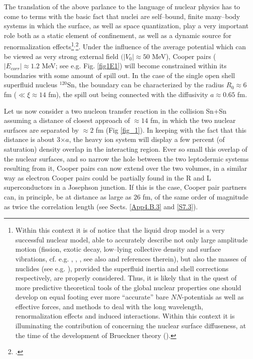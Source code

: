 The translation of the above parlance to the language of nuclear physics has to come to terms with the basic fact that nuclei are self--bound, finite many--body systems in which the surface, as well as space quantization, play a very important role both as a static element of confinement, as well as a dynamic source for renormalization effects\footnote{Within this context it is of notice that the liquid drop model is a very successful nuclear model, able to accurately describe not only large amplitude motion (fission, exotic decay, low--lying collective density and surface vibrations, cf. e.g. \cite{Bohr:39}, \cite{Barranco:90}, \cite{Bertsch:88b}, see also \cite{Brink:05} and references therein), but also the masses of nuclides (see e.g. \cite{Moller:95}), provided the superfluid inertia and shell corrections respectively, are properly considered. Thus, it is likely that in the quest of  more predictive theoretical tools of the global nuclear properties one should develop on equal footing ever more ``accurate'' bare $NN$-potentials as well as effective forces, and methods to deal with the long wavelength, renormalization effects and induced interactions. Within this context it is illuminating the contribution of \cite{Anderson:62} concerning the nuclear surface diffuseness, at the time of the development of  Brueckner theory (\cite{Brueckner:61}).}$^,$\footnote{\cite{Broglia:02d}.}.
Under the influence of the average potential which can be viewed as very strong external field $(|V_0|\approx 50$ MeV), Cooper pairs ($|E_{corr}|\approx 1.2$ MeV; see e.g. Fig. \ref{fig1E1}) will become constrained within its boundaries with some amount of spill out. In the case of the single open shell superfluid nucleus $^{120}$Sn, the boundary can be characterized by the radius $R_0\approx 6$ fm ($\ll \xi\approx 14$ fm), the spill out being connected with the diffusivity $a\approx 0.65$ fm. 


Let us now consider a two nucleon transfer reaction in the collision Sn+Sn assuming a distance of closest approach of $\approx 14$ fm, in which the two nuclear surfaces are separated by $\approx 2$ fm (Fig \ref{fig_1}). In keeping with the fact that this distance is about 3$\times a$, the heavy ion system will display a few percent (of saturation) density overlap in the interacting region. Ever so small this overlap of the nuclear surfaces, and so narrow the hole between the two leptodermic systems resulting from  it,  Cooper pairs can now extend over the two volumes, in a similar way as electron Cooper pairs could be partially found in the R and L superconductors in a Josephson junction. If this is the case, Cooper pair partners can, in principle, be at distance as large as 26 fm, of the same order of magnitude as twice the correlation length (see Sects. \ref{App4.B.3} and \ref{S7.3}). 

